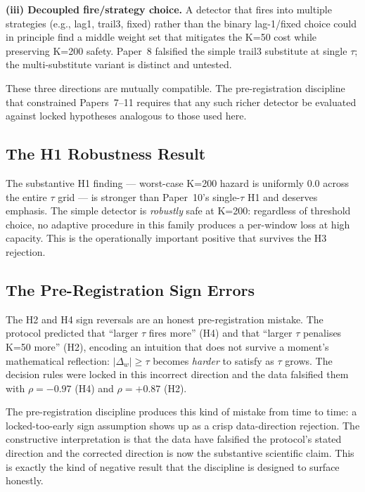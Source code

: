 \textbf{(iii) Decoupled fire/strategy choice.} A detector that fires
into multiple strategies (e.g., \textsf{lag1}, \textsf{trail3},
\textsf{fixed}) rather than the binary lag-1/fixed choice could in
principle find a middle weight set that mitigates the K=50 cost
while preserving K=200 safety. Paper~8 falsified the simple trail3
substitute at single $\tau$; the multi-substitute variant is
distinct and untested.

These three directions are mutually compatible. The pre-registration
discipline that constrained Papers~7--11 requires that any such
richer detector be evaluated against locked hypotheses analogous to
those used here.

\subsection{The H1 Robustness Result}

The substantive H1 finding --- worst-case K=200 hazard is uniformly
$0.0$ across the entire $\tau$ grid --- is stronger than Paper~10's
single-$\tau$ H1 and deserves emphasis. The simple detector is
\textit{robustly} safe at K=200: regardless of threshold choice, no
adaptive procedure in this family produces a per-window loss at high
capacity. This is the operationally important positive that survives
the H3 rejection.

\subsection{The Pre-Registration Sign Errors}

The H2 and H4 sign reversals are an honest pre-registration mistake.
The protocol predicted that ``larger $\tau$ fires more'' (H4) and
that ``larger $\tau$ penalises K=50 more'' (H2), encoding an
intuition that does not survive a moment's mathematical reflection:
$|\Delta_w| \geq \tau$ becomes \textit{harder} to satisfy as $\tau$
grows. The decision rules were locked in this incorrect direction
and the data falsified them with $\rho = -0.97$ (H4) and $\rho =
+0.87$ (H2).

The pre-registration discipline produces this kind of mistake from
time to time: a locked-too-early sign assumption shows up as a
crisp data-direction rejection. The constructive interpretation is
that the data have falsified the protocol's stated direction and
the corrected direction is now the substantive scientific claim.
This is exactly the kind of negative result that the discipline is
designed to surface honestly.


